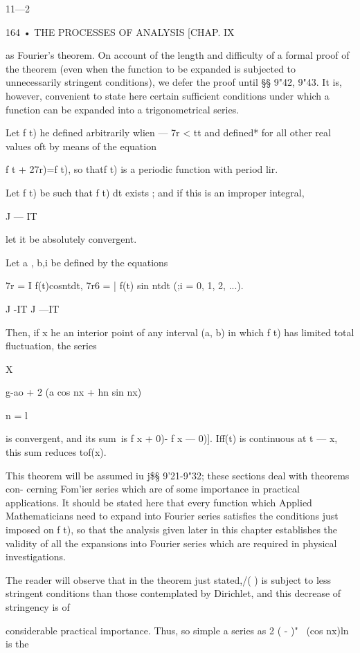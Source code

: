 11—2

164 • THE PROCESSES OF ANALYSIS [CHAP. IX

as Fourier's theorem. On account of the length and difficulty of a
formal proof of the theorem (even when the function to be expanded is
subjected to unnecessarily stringent conditions), we defer the proof
until §§ 9"42, 9"43. It is, however, convenient to state here certain
sufficient conditions under which a function can be expanded into a
trigonometrical series.

Let f t) he defined arbitrarily wlien — 7r < tt and defined* for all
other real values oft by means of the equation

f t + 27r)=f t), so thatf t) is a periodic function with period lir.

Let f t) be such that f t) dt exists ; and if this is an improper
integral,

J — IT

let it be absolutely convergent.

Let a , b,i be defined by the equations

7r = I f(t)cosntdt, 7r6 = | f(t) sin ntdt (;i = 0, 1, 2, ...).

J -IT J —IT

Then, if x he an interior point of any interval (a, b) in which f t)
has limited total fluctuation, the series

X

 g-ao + 2 (a cos nx + hn sin nx)

n = l

is convergent, and its sum\ is f x + 0)- f x — 0)]. Iff(t) is
continuous at t — x, this sum reduces tof(x).

This theorem will be assumed iu j\$§ 9'21-9"32; these sections deal
with theorems con- cerning Fom'ier series which are of some importance
in practical applications. It should be stated here that every
function which Applied Mathematicians need to expand into Fourier
series satisfies the conditions just imposed on f t), so that the
analysis given later in this chapter establishes the validity of all
the expansions into Fourier series which are required in physical
investigations.

The reader will observe that in the theorem just stated,/( ) is
subject to less stringent conditions than those contemplated by
Dirichlet, and this decrease of stringency is of

considerable practical importance. Thus, so simple a series as 2 ( -
)"~ (cos nx)ln is the

